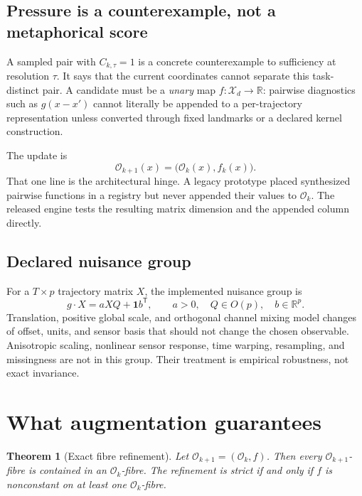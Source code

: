 \documentclass[10pt]{article}
\newtheorem{theorem}{Theorem}[section]
\theoremstyle{definition}
\theoremstyle{remark}
\newcommand{\R}{\mathbb R}
\newcommand{\cX}{\mathcal X}
\newcommand{\Obs}{\mathcal O}
\begin{document}
\subsection{Pressure is a counterexample, not a metaphorical score}

A sampled pair with $C_{k,\tau}=1$ is a concrete counterexample to sufficiency at resolution $\tau$. It says that the current coordinates cannot separate this task-distinct pair. A candidate must be a \emph{unary} map $f:\cX_d\to\R$: pairwise diagnostics such as $g(x-x')$ cannot literally be appended to a per-trajectory representation unless converted through fixed landmarks or a declared kernel construction.

The update is
\begin{equation}
  \Obs_{k+1}(x)=\bigl(\Obs_k(x),f_k(x)\bigr).
  \label{eq:append}
\end{equation}
That one line is the architectural hinge. A legacy prototype placed synthesized pairwise functions in a registry but never appended their values to $\Obs_k$. The released engine tests the resulting matrix dimension and the appended column directly.

\subsection{Declared nuisance group}

For a $T\times p$ trajectory matrix $X$, the implemented nuisance group is
\begin{equation}
  g\cdot X=aXQ+\bm1 b^\mathsf T,
  \qquad a>0,\quad Q\in O(p),\quad b\in\R^p.
  \label{eq:nuisance-group}
\end{equation}
Translation, positive global scale, and orthogonal channel mixing model changes of offset, units, and sensor basis that should not change the chosen observable. Anisotropic scaling, nonlinear sensor response, time warping, resampling, and missingness are not in this group. Their treatment is empirical robustness, not exact invariance.

\section{What augmentation guarantees}
\label{sec:theorems}

\begin{theorem}[Exact fibre refinement]
\label{thm:refinement}
Let $\Obs_{k+1}=(\Obs_k,f)$. Then every $\Obs_{k+1}$-fibre is contained in an $\Obs_k$-fibre. The refinement is strict if and only if $f$ is nonconstant on at least one $\Obs_k$-fibre.
\end{theorem}
\end{document}
